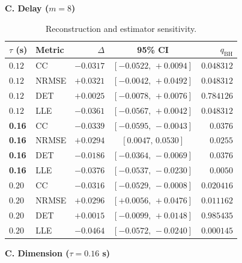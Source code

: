 \documentclass[conference,a4paper]{IEEEtran}
\renewcommand{\thetable}{S\arabic{table}}
\begin{document}

\begin{table}[!tbp]

\addtocounter{table}{-1}
\renewcommand{\thetable}{S\arabic{table}B}

\centering
\caption{Reconstruction and estimator sensitivity.}
\label{tab:supp_sensitivity_estimators}
\footnotesize
\setlength{\tabcolsep}{1.5pt}
\renewcommand{\arraystretch}{1.12}

\begin{minipage}[t]{0.49\textwidth}
\raggedright
\textbf{C. Delay ($m=8$)}\par\smallskip

\begin{tabular*}{\linewidth}{@{\extracolsep{\fill}}llrcr@{}}
\toprule
$\tau$ (s) & Metric & $\Delta$ & 95\% CI & $q_{\mathrm{BH}}$\\
\midrule
$0.12$ & CC    & $-0.0317$ & $[-0.0522,\,+0.0094]$ & $0.048312$\\
$0.12$ & NRMSE & $+0.0321$ & $[-0.0042,\,+0.0492]$ & $0.048312$\\
$0.12$ & DET   & $+0.0025$ & $[-0.0078,\,+0.0076]$ & $0.784126$\\
$0.12$ & LLE   & $-0.0361$ & $[-0.0567,\,+0.0042]$ & $0.048312$\\
\textbf{0.16} & CC    & $-0.0339$ & $[-0.0595,\,-0.0043]$ & $0.0376$\\
\textbf{0.16} & NRMSE & $+0.0294$ & $[0.0047,\,0.0530]$   & $0.0255$\\
\textbf{0.16} & DET   & $-0.0186$ & $[-0.0364,\,-0.0069]$ & $0.0376$\\
\textbf{0.16} & LLE   & $-0.0376$ & $[-0.0537,\,-0.0230]$ & $0.0050$\\
$0.20$ & CC    & $-0.0316$ & $[-0.0529,\,-0.0008]$ & $0.020416$\\
$0.20$ & NRMSE & $+0.0296$ & $[+0.0056,\,+0.0476]$ & $0.011162$\\
$0.20$ & DET   & $+0.0015$ & $[-0.0099,\,+0.0148]$ & $0.985435$\\
$0.20$ & LLE   & $-0.0464$ & $[-0.0572,\,-0.0240]$ & $0.000145$\\
\bottomrule
\end{tabular*}
\end{minipage}
\hfill
\begin{minipage}[t]{0.49\textwidth}
\raggedright
\textbf{C. Dimension ($\tau=0.16$ s)}\par\smallskip


\end{minipage}
\end{table}
\end{document}
